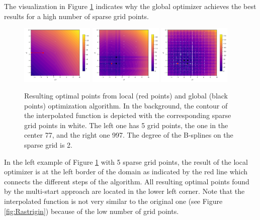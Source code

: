 The visualization in Figure \ref{fig:optimizers_visualized} indicates why the global optimizer achieves the best results for a high number of sparse grid points. 
\begin{figure}[H]
	\centering
	\includegraphics[width=0.31\textwidth]{figures/Results/Testfunctions/Optimizer_visualization/Optimizers_visualization5}
	\includegraphics[width=0.31\textwidth]{figures/Results/Testfunctions/Optimizer_visualization/Optimizers_visualization80}
	\includegraphics[width=0.31\textwidth]{figures/Results/Testfunctions/Optimizer_visualization/Optimizers_visualization1000}
	
	\caption{Resulting optimal points from local (red points) and global (black points) optimization algorithm. In the background, the contour of the interpolated function is depicted with the corresponding sparse grid points in white. The left one has 5 grid points, the one in the center 77, and the right one 997. The degree of the B-splines on the sparse grid is 2. }
	\label{fig:optimizers_visualized}
\end{figure}

In the left example of Figure \ref{fig:optimizers_visualized} with 5 sparse grid points, the result of the local optimizer is at the left border of the domain as indicated by the red line which connects the different steps of the algorithm. All resulting optimal points found by the multi-start approach are located in the lower left corner. Note that the interpolated function is not very similar to the original one (see Figure \ref{fig:Rastrigin}) because of the low number of grid points. 

